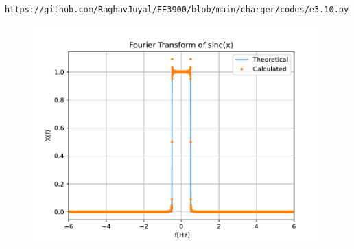 \documentclass[journal,12pt,twocolumn]{IEEEtran}
\renewcommand\thesection{\arabic{section}}
\begin{document}
\begin{enumerate}[label=\thesection.\arabic*
,ref=\thesection.\theenumi]
\begin{align}
\end{align}
\begin{lstlisting}
https://github.com/RaghavJuyal/EE3900/blob/main/charger/codes/e3.10.py
\end{lstlisting}
\begin{figure}[!ht]
	\begin{center}
		\includegraphics[width=\columnwidth]{./figs/e3.10.pdf}
	\end{center}
	\label{fig:}	
\end{figure}
\end{enumerate}
\end{document}

